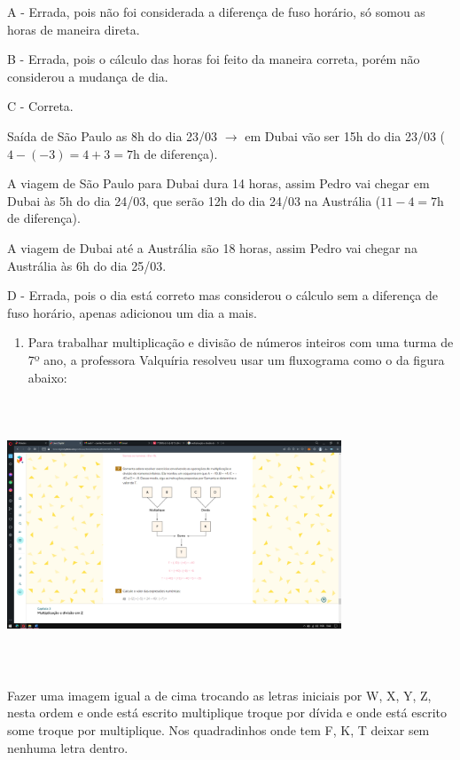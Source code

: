 A - Errada, pois não foi considerada a diferença de fuso horário, só
somou as horas de maneira direta.

B - Errada, pois o cálculo das horas foi feito da maneira correta, porém
não considerou a mudança de dia.

C - Correta.

Saída de São Paulo as 8h do dia 23/03 \(\rightarrow\) em Dubai vão ser
15h do dia 23/03 (\(4 - ( - 3) = 4 + 3 = 7\text{h\ }\)de diferença).

A viagem de São Paulo para Dubai dura 14 horas, assim Pedro vai chegar
em Dubai às 5h do dia 24/03, que serão 12h do dia 24/03 na Austrália
(\(11 - 4 = 7\text{h\ }\)de diferença).

A viagem de Dubai até a Austrália são 18 horas, assim Pedro vai chegar
na Austrália às 6h do dia 25/03.

D - Errada, pois o dia está correto mas considerou o cálculo sem a
diferença de fuso horário, apenas adicionou um dia a mais.

\begin{enumerate}
\def\labelenumi{\arabic{enumi})}
\setcounter{enumi}{1}
\tightlist
\item
  Para trabalhar multiplicação e divisão de números inteiros com uma
  turma de 7º ano, a professora Valquíria resolveu usar um fluxograma
  como o da figura abaixo:
\end{enumerate}

\includegraphics[width=3.92296in,height=3.18898in]{./imgSAEB_7_MAT/media/image3.png}

Fazer uma imagem igual a de cima trocando as letras iniciais por W, X,
Y, Z, nesta ordem e onde está escrito multiplique troque por dívida e
onde está escrito some troque por multiplique. Nos quadradinhos onde tem
F, K, T deixar sem nenhuma letra dentro.

